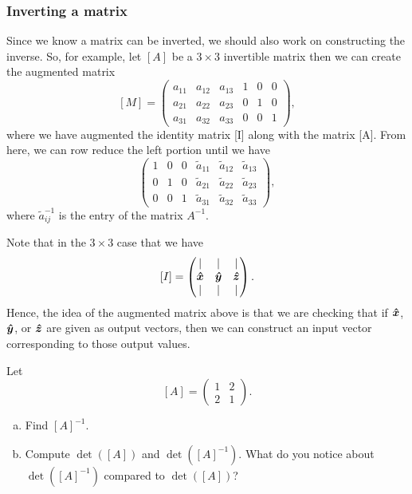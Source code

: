        \subsubsection{Inverting a matrix}
        
        Since we know a matrix can be inverted, we should also work on constructing the inverse. So, for example, let $[A]$ be a $3\times 3$ invertible matrix then we can create the augmented matrix
        \[
        [M]=
        \left( \begin{array}{ccc|ccc}
        a_{11} & a_{12} & a_{13} & 1 & 0 & 0 \\
        a_{21} & a_{22} & a_{23} & 0 & 1 & 0 \\
        a_{31} & a_{32} & a_{33} & 0 & 0 & 1 
        \end{array} \right),
        \]
        where we have augmented the identity matrix [I] along with the matrix [A]. From here, we can row reduce the left portion until we have
        \[
        \left( \begin{array}{ccc|ccc}
        1 & 0 & 0 & \tilde{a}_{11} & \tilde{a}_{12} & \tilde{a}_{13}\\
        0 & 1 & 0 & \tilde{a}_{21} & \tilde{a}_{22} & \tilde{a}_{23} \\
        0 & 0 & 1 & \tilde{a}_{31} & \tilde{a}_{32} & \tilde{a}_{33} 
        \end{array} \right),
        \]
        where $\tilde{a}_{ij}^{-1}$ is the entry of the matrix $A^{-1}$. 
        
        Note that in the $3\times 3$ case that we have
        \[
        [I] = \begin{pmatrix} \vert & \vert & \vert \\ \boldsymbol{\hat{x}} & \boldsymbol{\hat{y}} & \boldsymbol{\hat{z}} \\ \vert & \vert & \vert \end{pmatrix}.
        \]
        Hence, the idea of the augmented matrix above is that we are checking that if $\boldsymbol{\hat{x}}$, $\boldsymbol{\hat{y}}$, or $\boldsymbol{\hat{z}}$ are given as output vectors, then we can construct an input vector corresponding to those output values. 
        
        
        \begin{exercise}
        Let
        \[
        [A]=\begin{pmatrix}
        1 & 2\\
        2 & 1
        \end{pmatrix}.
        \]
        \begin{enumerate}[(a)]
            \item Find $[A]^{-1}$.
            \item Compute $\det([A])$ and $\det([A]^{-1})$. What do you notice about $\det([A]^{-1})$ compared to $\det([A])$?
        \end{enumerate}
        \end{exercise}
        
